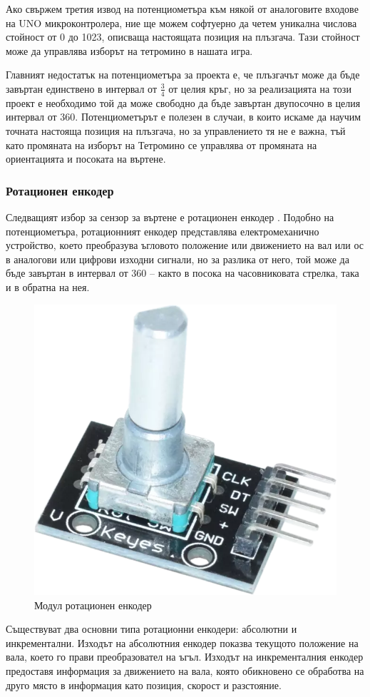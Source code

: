 \documentclass[titlepage, oneside, 14pt]{extbook}
\begin{document}
Ако свържем третия извод на потенциометъра към някой от аналоговите входове на UNO микроконтролера,
ние ще можем софтуерно да четем уникална числова стойност от 0 до 1023, описваща настоящата позиция
на плъзгача. Тази стойност може да управлява изборът на тетромино в нашата игра.

Главният недостатък на потенциометъра за проекта е, че плъзгачът може да бъде завъртан
единствено в интервал от $\frac{3}{4}$ от целия кръг, но за реализацията на този проект е необходимо
той да може свободно да бъде завъртан двупосочно в целия интервал от
360\textdegree{}. Потенциометърът е полезен в случаи, в които искаме да научим точната настояща позиция
на плъзгача, но за управлението тя не е важна, тъй като промяната на изборът на Тетромино се управлява
от промяната на ориентацията и посоката на въртене.

\subsubsection{Ротационен енкодер}

Следващият избор за сензор за въртене е ротационен енкодер \cite{encodertut}. Подобно на потенциометъра, ротационният енкодер представлява
електромеханично устройство, което преобразува ъгловото положение или движението на вал или ос
в аналогови или цифрови изходни сигнали, но за разлика от него, той може да
бъде завъртан в интервал от 360\textdegree{} -- както в посока на часовниковата
стрелка, така и в обратна на нея.

\begin{figure}[!htbp]
    \centering
    \includegraphics[width=0.5\linewidth]{img/encoder.png}
    \caption{Модул ротационен енкодер}
\end{figure}

Съществуват два основни типа ротационни енкодери: абсолютни и инкрементални. Изходът на абсолютния енкодер показва текущото
положение на вала, което го прави преобразовател на ъгъл. Изходът на
инкременталния енкодер предоставя информация за движението на вала, която
обикновено се обработва на друго място в информация като позиция, скорост и
разстояние.
\end{document}
